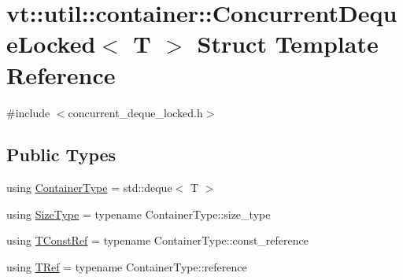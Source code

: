 \hypertarget{structvt_1_1util_1_1container_1_1_concurrent_deque_locked}{}\section{vt\+:\+:util\+:\+:container\+:\+:Concurrent\+Deque\+Locked$<$ T $>$ Struct Template Reference}
\label{structvt_1_1util_1_1container_1_1_concurrent_deque_locked}


{\ttfamily \#include $<$concurrent\+\_\+deque\+\_\+locked.\+h$>$}

\subsection*{Public Types}
\begin{DoxyCompactItemize}
\item 
using \hyperlink{structvt_1_1util_1_1container_1_1_concurrent_deque_locked_ab8d922cda54539b322830391268284bb}{Container\+Type} = std\+::deque$<$ T $>$
\item 
using \hyperlink{structvt_1_1util_1_1container_1_1_concurrent_deque_locked_a6f35f4923f1329d25378656b0582e916}{Size\+Type} = typename Container\+Type\+::size\+\_\+type
\item 
using \hyperlink{structvt_1_1util_1_1container_1_1_concurrent_deque_locked_a9da9776dff836c013a95431f3ab15e35}{T\+Const\+Ref} = typename Container\+Type\+::const\+\_\+reference
\item 
using \hyperlink{structvt_1_1util_1_1container_1_1_concurrent_deque_locked_a4451b0e7f6c8aa741f98a77a9fed353e}{T\+Ref} = typename Container\+Type\+::reference
\end{DoxyCompactItemize}
